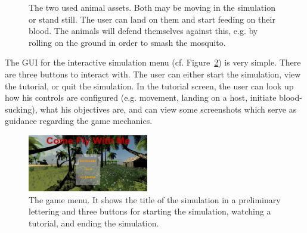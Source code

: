 \documentclass{sig-alternate-05-2015}
\begin{document}
\begin{figure}[ht!]
{}

\caption{The two used animal assets. Both may be moving in the simulation or stand still. The user can land on them and start feeding on their blood. The animals will defend themselves against this, e.g. by rolling on the ground in order to smash the mosquito.}
\label{fig:animals}
\end{figure}

The GUI for the interactive simulation menu (cf. Figure~\ref{fig:gui}) is very simple. There are three buttons to interact with. The user can either start the simulation, view the tutorial, or quit the simulation. In the tutorial screen, the user can look up how his controls are configured (e.g. movement, landing on a host, initiate blood-sucking), what his objectives are, and can view some screenshots which serve as guidance regarding the game mechanics.

\begin{figure}[ht!]
\includegraphics[width=0.47\textwidth]{Figures/gui.png}
\caption{The game menu. It shows the title of the simulation in a preliminary lettering and three buttons for starting the simulation, watching a tutorial, and ending the simulation.}
\label{fig:gui}
\end{figure}
\end{document}
